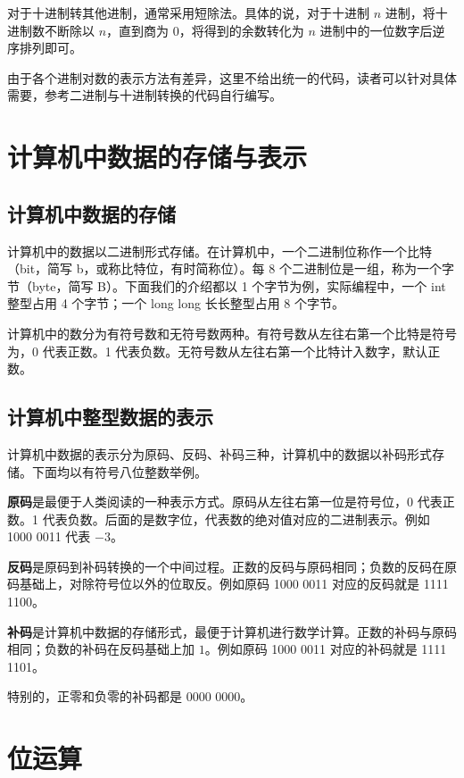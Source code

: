 对于十进制转其他进制，通常采用短除法。具体的说，对于十进制 $n$ 进制，将十进制数不断除以 $n$，直到商为 $0$，将得到的余数转化为 $n$ 进制中的一位数字后逆序排列即可。

由于各个进制对数的表示方法有差异，这里不给出统一的代码，读者可以针对具体需要，参考二进制与十进制转换的代码自行编写。

\section{计算机中数据的存储与表示}

\subsection{计算机中数据的存储}

计算机中的数据以二进制形式存储。在计算机中，一个二进制位称作一个比特（bit，简写 b，或称比特位，有时简称位）。每 8 个二进制位是一组，称为一个字节（byte，简写 B）。下面我们的介绍都以 1 个字节为例，实际编程中，一个 int 整型占用 4 个字节；一个 long long 长长整型占用 8 个字节。

计算机中的数分为有符号数和无符号数两种。有符号数从左往右第一个比特是符号为，0 代表正数。1 代表负数。无符号数从左往右第一个比特计入数字，默认正数。

\subsection{计算机中整型数据的表示}

计算机中数据的表示分为原码、反码、补码三种，计算机中的数据以补码形式存储。下面均以有符号八位整数举例。

\textbf{原码}是最便于人类阅读的一种表示方式。原码从左往右第一位是符号位，0 代表正数。1 代表负数。后面的是数字位，代表数的绝对值对应的二进制表示。例如 1000 0011 代表 $-3$。

\textbf{反码}是原码到补码转换的一个中间过程。正数的反码与原码相同；负数的反码在原码基础上，对除符号位以外的位取反。例如原码 1000 0011 对应的反码就是 1111 1100。

\textbf{补码}是计算机中数据的存储形式，最便于计算机进行数学计算。正数的补码与原码相同；负数的补码在反码基础上加 $1$。例如原码 1000 0011 对应的补码就是 1111 1101。

特别的，正零和负零的补码都是 0000 0000。

\section{位运算}

